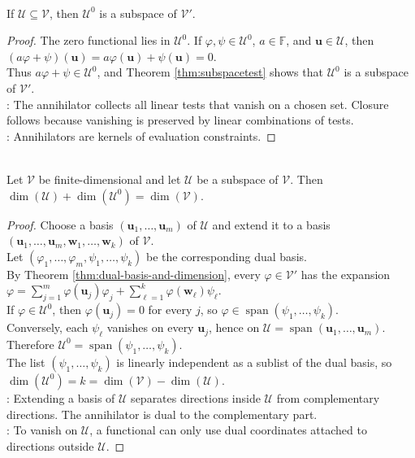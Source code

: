 \begin{proposition} \label{prop:annihilator-is-subspace} \\
If $\mathcal{U}\subseteq\mathcal{V}$, then $\mathcal{U}^0$ is a subspace of $\mathcal{V}'$.
\begin{proof}
The zero functional lies in $\mathcal{U}^0$. If $\varphi,\psi\in\mathcal{U}^0$, $a\in\mathbb{F}$, and $\mathbf{u}\in\mathcal{U}$, then $(a\varphi+\psi)(\mathbf{u})=a\varphi(\mathbf{u})+\psi(\mathbf{u})=0$.\\
Thus $a\varphi+\psi\in\mathcal{U}^0$, and Theorem \ref{thm:subspacetest} shows that $\mathcal{U}^0$ is a subspace of $\mathcal{V}'$.\\
: The annihilator collects all linear tests that vanish on a chosen set. Closure follows because vanishing is preserved by linear combinations of tests.\\
: Annihilators are kernels of evaluation constraints.
\end{proof}
\end{proposition}

\begin{theorem} \label{thm:dimension-of-annihilator} \\
Let $\mathcal{V}$ be finite-dimensional and let $\mathcal{U}$ be a subspace of $\mathcal{V}$. Then $\dim(\mathcal{U})+\dim(\mathcal{U}^0)=\dim(\mathcal{V})$.
\begin{proof}
Choose a basis $(\mathbf{u}_1,\ldots,\mathbf{u}_m)$ of $\mathcal{U}$ and extend it to a basis $(\mathbf{u}_1,\ldots,\mathbf{u}_m,\mathbf{w}_1,\ldots,\mathbf{w}_k)$ of $\mathcal{V}$.\\
Let $(\varphi_1,\ldots,\varphi_m,\psi_1,\ldots,\psi_k)$ be the corresponding dual basis.\\
By Theorem \ref{thm:dual-basis-and-dimension}, every $\varphi\in\mathcal{V}'$ has the expansion $\varphi=\sum\limits_{j=1}^m \varphi(\mathbf{u}_j)\varphi_j+\sum\limits_{\ell=1}^k \varphi(\mathbf{w}_\ell)\psi_\ell$.\\
If $\varphi\in\mathcal{U}^0$, then $\varphi(\mathbf{u}_j)=0$ for every $j$, so $\varphi\in\operatorname{span}(\psi_1,\ldots,\psi_k)$.\\
Conversely, each $\psi_\ell$ vanishes on every $\mathbf{u}_j$, hence on $\mathcal{U}=\operatorname{span}(\mathbf{u}_1,\ldots,\mathbf{u}_m)$. Therefore $\mathcal{U}^0=\operatorname{span}(\psi_1,\ldots,\psi_k)$.\\
The list $(\psi_1,\ldots,\psi_k)$ is linearly independent as a sublist of the dual basis, so $\dim(\mathcal{U}^0)=k=\dim(\mathcal{V})-\dim(\mathcal{U})$.\\
: Extending a basis of $\mathcal{U}$ separates directions inside $\mathcal{U}$ from complementary directions. The annihilator is dual to the complementary part.\\
: To vanish on $\mathcal{U}$, a functional can only use dual coordinates attached to directions outside $\mathcal{U}$.
\end{proof}
\end{theorem}

